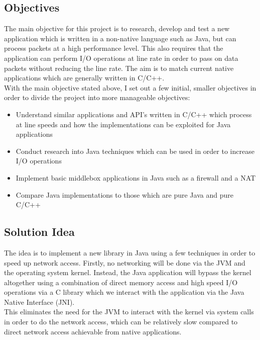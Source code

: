 \documentclass[interim_report.tex]{subfiles}
\begin{document}
\subsection{Objectives}
The main objective for this project is to research, develop and test a new application which is written in a non-native language such as Java, but can process packets at a high performance level. This also requires that the application can perform I/O operations at line rate in order to pass on data packets without reducing the line rate. The aim is to match current native applications which are generally written in C/C++. \\
\newline
With the main objective stated above, I set out a few initial, smaller objectives in order to divide the project into more manageable objectives:
\begin{itemize}
	\item Understand similar applications and API's written in C/C++ which process at line speeds and how the implementations can be exploited for Java applications
	\item Conduct research into Java techniques which can be used in order to increase I/O operations
	\item Implement basic middlebox applications in Java such as a firewall and a NAT
	\item Compare Java implementations to those which are pure Java and pure C/C++
\end{itemize}

\subsection{Solution Idea}
The idea is to implement a new library in Java using a few techniques in order to speed up network access. Firstly, no networking will be done via the JVM and the operating system kernel. Instead, the Java application will bypass the kernel altogether using a combination of direct memory access and high speed I/O operations via a C library which we interact with the application via the Java Native Interface (JNI). \\
\newline
This eliminates the need for the JVM to interact with the kernel via system calls in order to do the network access, which can be relatively slow compared to direct network access achievable from native applications.
\end{document}
